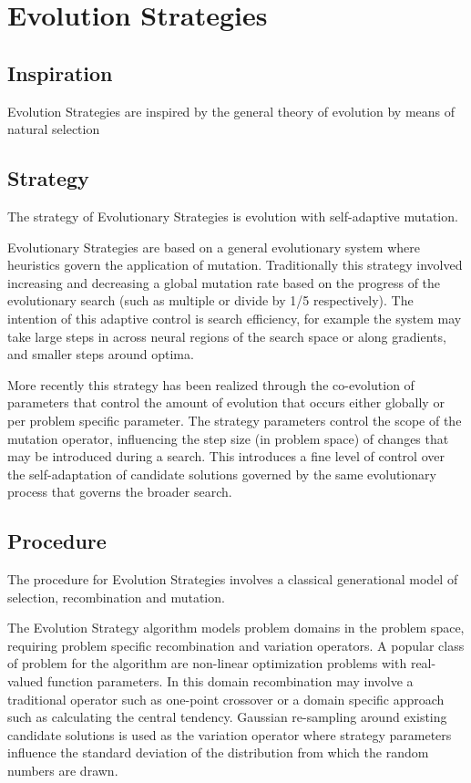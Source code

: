 \section{Evolution Strategies}

\subsection{Inspiration}
Evolution Strategies are inspired by the general theory of evolution by means of natural selection

\subsection{Strategy}
The strategy of Evolutionary Strategies is evolution with self-adaptive mutation. 

Evolutionary Strategies are based on a general evolutionary system where heuristics govern the application of mutation. Traditionally this strategy involved increasing and decreasing a global mutation rate based on the progress of the evolutionary search (such as multiple or divide by 1/5 respectively). The intention of this adaptive control is search efficiency, for example the system may take large steps in across neural regions of the search space or along gradients, and smaller steps around optima.

More recently this strategy has been realized through the co-evolution of parameters that control the amount of evolution that occurs either globally or per problem specific parameter. The strategy parameters control the scope of the mutation operator, influencing the step size (in problem space) of changes that may be introduced during a search. This introduces a fine level of control over the self-adaptation of candidate solutions governed by the same evolutionary process that governs the broader search.

\subsection{Procedure}
The procedure for Evolution Strategies involves a classical generational model of selection, recombination and mutation.

The Evolution Strategy algorithm models problem domains in the problem space, requiring problem specific recombination and variation operators. A popular class of problem for the algorithm are non-linear optimization problems with real-valued function parameters. In this domain recombination may involve a traditional operator such as one-point crossover or a domain specific approach such as calculating the central tendency. Gaussian re-sampling around existing candidate solutions is used as the variation operator where strategy parameters influence the standard deviation of the distribution from which the random numbers are drawn.

